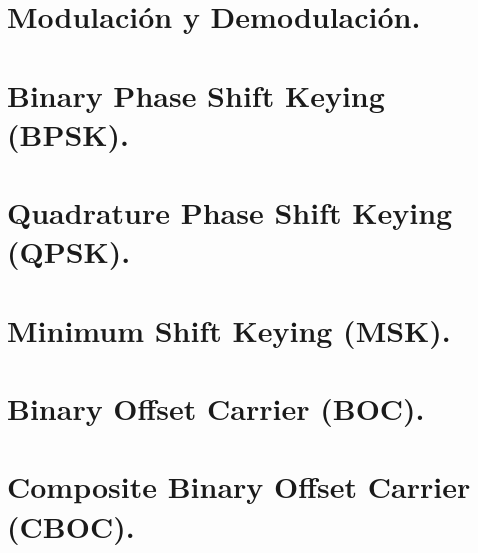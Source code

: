 \section*{\fontsize{12}{18}\selectfont Modulación y Demodulación.}

\begin{justify}
\end{justify}

\section*{\fontsize{12}{18}\selectfont Binary Phase Shift Keying (BPSK).}

\begin{justify}
\end{justify}

\section*{\fontsize{12}{18}\selectfont Quadrature Phase Shift Keying (QPSK).}

\begin{justify}
\end{justify}

\section*{\fontsize{12}{18}\selectfont Minimum Shift Keying (MSK).}

\begin{justify}
\end{justify}

\section*{\fontsize{12}{18}\selectfont Binary Offset Carrier (BOC).}

\begin{justify}
\end{justify}

\section*{\fontsize{12}{18}\selectfont Composite Binary Offset Carrier (CBOC).}

\begin{justify}
\end{justify}